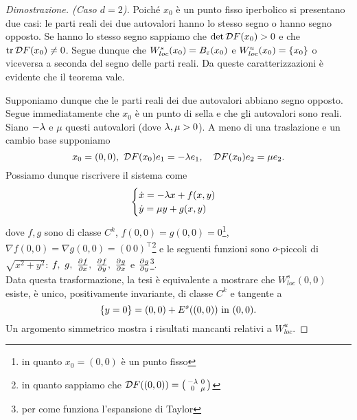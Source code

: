 \begin{proof}[Dimostrazione. (Caso $d=2$)]
Poich\'e $x_0$ \`e un punto fisso iperbolico si presentano due casi: le parti reali dei due autovalori hanno lo stesso segno o hanno segno opposto. Se hanno lo stesso segno sappiamo che $\det \mathcal{D} F(x_0)>0$ e che $\mathrm{tr}\, \mathcal{D} F(x_0)\neq 0$. Segue dunque che $W^s_{loc}(x_0)=B_\varepsilon(x_0)$ e $W^u_{loc}(x_0)=\left\{{x_0}\right\}$ o viceversa a seconda del segno delle parti reali. Da queste caratterizzazioni \`e evidente che il teorema vale.
\vspace{0.5cm}

\noindent Supponiamo dunque che le parti reali dei due autovalori abbiano segno opposto. Segue immediatamente che $x_0$ \`e un punto di sella e che gli autovalori sono reali. Siano $-\lambda$ e $\mu$ questi autovalori (dove $\lambda,\mu>0$). A meno di una traslazione e un cambio base supponiamo
\[x_0=(0,0),\ \mathcal{D} F(x_0)e_1=-\lambda e_1,\quad \mathcal{D} F(x_0)e_2=\mu e_2.\]
Possiamo dunque riscrivere il sistema come
\[\begin{cases}
\dot x=-\lambda x+f(x,y)\\
\dot y=\mu y+g(x,y)
\end{cases}\]
dove $f,g$ sono di classe $C^k$, $f(0,0)=g(0,0)=0$\footnote{in quanto $x_0=(0,0)$ \`e un punto fisso}, $\nabla f(0,0)=\nabla g(0,0)=(0\ 0)^\top$\footnote{in quanto sappiamo che $\mathcal{D} F((0,0))=\left({\begin{smallmatrix}-\lambda &0\\0&\mu\end{smallmatrix}}\right)$} e le seguenti funzioni sono $o$-piccoli di $\sqrt{x^2+y^2}$: $f,\ g,\ \pp xf,\ \pp yf,\ \pp xg$ e $\pp y g$\footnote{per come funziona l'espansione di Taylor}.\\
Data questa trasformazione, la tesi \`e equivalente a mostrare che $W^s_{loc}(0,0)$ esiste, \`e unico, positivamente invariante, di classe $C^k$ e tangente a \[\left\{{y=0}\right\}=(0,0)+E^s((0,0))\text{ in }(0,0).\] Un argomento simmetrico mostra i risultati mancanti relativi a $W^u_{loc}$.
\vspace{0.5cm}


\end{proof}
